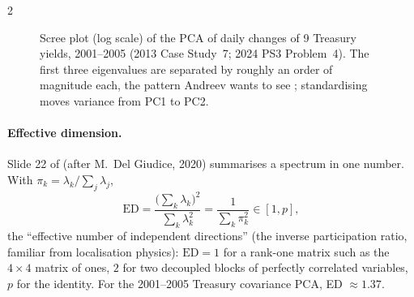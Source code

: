 \begin{paracol}{2}
\begin{figure}[ht]
\centering
{}
\caption{Scree plot (log scale) of the PCA of daily changes of 9 Treasury yields, 2001--2005 (2013 Case
Study~7; 2024 PS3 Problem~4). The first three eigenvalues are separated by roughly an order of magnitude
each, the pattern Andreev wants to see ; standardising moves variance from PC1 to PC2.}\label{ch07:fig-scree}
\end{figure}

\paragraph{Effective dimension.} Slide 22 of  (after M.~Del Giudice, 2020) summarises a spectrum
in one number. With $\pi_k=\lambda_k/\sum_j\lambda_j$,
\[
  \mathrm{ED}=\frac{\bigl(\sum_k\lambda_k\bigr)^2}{\sum_k\lambda_k^2}=\frac{1}{\sum_k\pi_k^2}\in[1,p],
\]
the ``effective number of independent directions'' (the inverse participation ratio, familiar from
localisation physics): $\mathrm{ED}=1$ for a rank-one matrix such as the $4\times4$ matrix of ones, $2$ for two
decoupled blocks of perfectly correlated variables, $p$ for the identity. For the 2001--2005 Treasury covariance
PCA, ED $\approx1.37$.


\end{paracol}
